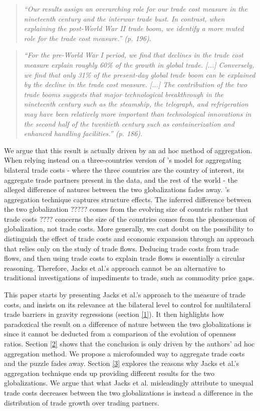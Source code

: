 \documentclass{article}
\begin{document}
\begin{quote}
\emph{``Our results assign an overarching role for our trade
cost measure in the nineteenth century and the interwar trade
bust. In contrast, when explaining the post-World War II trade
boom, we identify a more muted role for the trade cost
measure.'' (p. 196)}.
\end{quote}
\begin{quote}
\emph{``For the pre-World War I period, we find that declines
in the trade cost measure explain roughly 60\% of the growth in
global trade. [...] Conversely, we find that only 31\% of the
present-day global trade boom can be explained by the decline
in the trade cost measure. [...] The contribution of the two
trade booms suggests that major technological breakthrough in
the nineteenth century such as the steamship, the telegraph,
and refrigeration may have been relatively more important than
technological innovations in the second half of the twentieth
century such as containerization and enhanced handling
facilities.'' (p. 186)}.
\end{quote}

We argue that this result is actually driven by an ad hoc
method of aggregation. When relying instead on a
three-countries version of \cite{AW2003}'s model for
aggregating bilateral trade costs - where the three countries
are the country of interest, its aggregate trade partners
present in the data, and the rest of the world - the alleged
difference of natures between the two globalizations fades
away. \cite{JMN2011}'s aggregation technique captures structure effects. The inferred difference between the
two globalization
????? comes from the evolving size of countris rather that trade costs ????
concerns the size of the countries comes from
the phenomenon of globalization, not trade costs. More generally, we
cast doubt on the possibility to distinguish the effect of trade costs and economic expansion through an approach that relies only on the study of trade
flows. Deducing trade costs from trade flows, and then using
trade costs to explain trade flows is essentially a circular
reasoning. Therefore, Jacks et al.'s approach cannot be an
alternative to traditional investigations of impediments to
trade, such as commodity price gaps.

This paper starts by presenting Jacks et al.'s approach to the
measure of trade costs, and insists on its relevance at the
bilateral level to control for multilateral trade barriers in
gravity regressions (section \ref{1}). It then highlights how paradoxical the
result on a difference of nature between the two globalizations
is since it cannot be deducted from a comparison of the
evolution of openness ratios. Section \ref{2} shows that the
conclusion is only driven by the authors' ad hoc aggregation
method. We propose a microfounded way to aggregate trade costs
and the puzzle fades away. Section \ref{3} explores the reasons
why Jacks et al.'s aggregation technique ends up providing
different results for the two globalizations. We argue that
what Jacks et al. misleadingly attribute to unequal trade costs
decreases between the two globalizations is instead a
difference in the distribution of trade growth over trading
partners.
\end{document}
